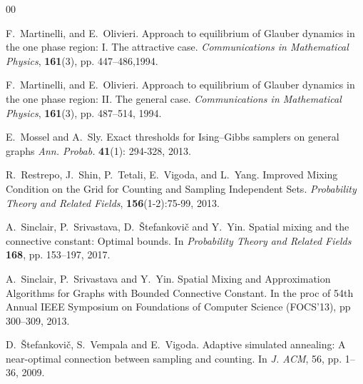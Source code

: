 \documentclass[11pt,reqno]{amsart}
\numberwithin{equation}{section}
\begin{document}
\begin{thebibliography}{00}
%
%
%

F.~Martinelli, and E.~Olivieri.
Approach to equilibrium of Glauber dynamics in the one phase region: I. The attractive case. {\em Communications in Mathematical Physics}, {\bf 161}(3), pp. 447--486,1994.

F.~Martinelli, and E.~Olivieri. Approach to equilibrium of Glauber dynamics in the one phase region: II. The general case. {\em Communications in Mathematical Physics}, 
{\bf 161}(3), pp. 487--514, 1994.

E.~Mossel and A.~Sly.
Exact thresholds for Ising–Gibbs samplers on general graphs
{\em Ann. Probab.} {\bf 41}(1): 294-328, 2013. 



R.~Restrepo, J.~Shin, P.~Tetali, E.~Vigoda, and L.~Yang. 
Improved Mixing Condition on the Grid for Counting and Sampling Independent Sets. 
{\em Probability Theory and Related Fields}, {\bf 156}(1-2):75-99, 2013.





A.~Sinclair, P.~Srivastava, D.~\v Stefankovi\v c and Y.~Yin.
Spatial mixing and the connective constant: Optimal bounds.
In {\em Probability Theory and Related Fields} {\bf 168}, pp. 153--197, 2017.


A.~Sinclair, P.~Srivastava and Y.~Yin.
Spatial Mixing and Approximation Algorithms for Graphs with Bounded Connective Constant. 
In the proc of 54th Annual {IEEE} Symposium on Foundations of Computer Science (FOCS'13),
pp 300--309, 2013. 



D.~\v Stefankovi\v c, S.~Vempala and E.~Vigoda. 
Adaptive simulated annealing: A near-optimal connection between sampling and counting.
In {\em J. ACM}, 56, pp. 1–36, 2009.




\end{thebibliography}
\end{document}
